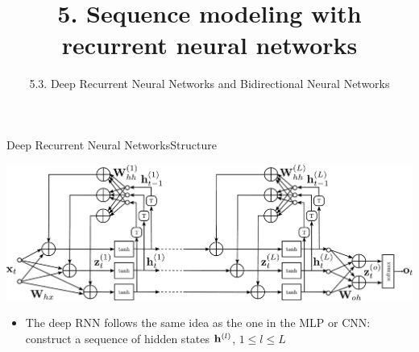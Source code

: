 \documentclass{beamer}
\title{5. Sequence modeling with recurrent neural networks}
\subtitle{5.3. Deep Recurrent Neural Networks and Bidirectional Neural Networks}
\begin{document}
\maketitle

\begin{frame}{Deep Recurrent Neural Networks}{Structure}
\begin{center}
\includegraphics[scale=0.23]{Module 5 (RNN)/pics/deep_rnn_rolled.pdf}
\end{center}
\begin{itemize}
\item The deep RNN follows the same idea as the one in the MLP or CNN: construct a sequence of hidden states ${\bf h}^{(l)}$, $1 \leq l \leq L$ 
\end{itemize}
\end{frame}
\end{document}

